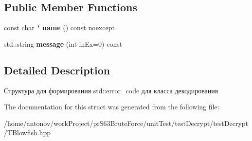 \subsection*{Public Member Functions}
\begin{DoxyCompactItemize}
\item 
\mbox{\label{structunit_test_1_1blowfish_exeption_1_1_t_blowfish_exeption_category_a731313abc90378c09e9db67710221dd4}} 
const char $\ast$ {\bfseries name} () const noexcept
\item 
\mbox{\label{structunit_test_1_1blowfish_exeption_1_1_t_blowfish_exeption_category_a61f1a71752ae221bd534fb613f01cd89}} 
std\+::string {\bfseries message} (int in\+Ex=0) const
\end{DoxyCompactItemize}


\subsection{Detailed Description}
Структура для формирования std\+::error\+\_\+code для класса декодирования 

The documentation for this struct was generated from the following file\+:\begin{DoxyCompactItemize}
\item 
/home/antonov/work\+Project/pr\+S63\+Brute\+Force/unit\+Test/test\+Decrypt/test\+Decrypt/T\+Blowfish.\+hpp\end{DoxyCompactItemize}
